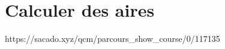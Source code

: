%
%
%
%
%
%
%
%
%


\chapter{Calculer des aires}
{https://sacado.xyz/qcm/parcours_show_course/0/117135}


